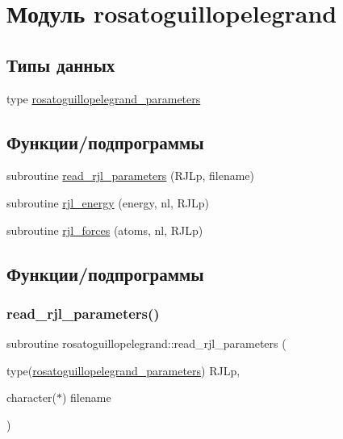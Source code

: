\hypertarget{namespacerosatoguillopelegrand}{}\section{Модуль rosatoguillopelegrand}
\label{namespacerosatoguillopelegrand}
\subsection*{Типы данных}
\begin{DoxyCompactItemize}
\item 
type \mbox{\hyperlink{structrosatoguillopelegrand_1_1rosatoguillopelegrand__parameters}{rosatoguillopelegrand\+\_\+parameters}}
\end{DoxyCompactItemize}
\subsection*{Функции/подпрограммы}
\begin{DoxyCompactItemize}
\item 
subroutine \mbox{\hyperlink{namespacerosatoguillopelegrand_ac5fa55316f7b8e860b3131c6f95c10ae}{read\+\_\+rjl\+\_\+parameters}} (R\+J\+Lp, filename)
\item 
subroutine \mbox{\hyperlink{namespacerosatoguillopelegrand_a06b6c23e50e301e053ed9ccb60e1ca34}{rjl\+\_\+energy}} (energy, nl, R\+J\+Lp)
\item 
subroutine \mbox{\hyperlink{namespacerosatoguillopelegrand_a3744fc3d1e6df3ca288ddc43df483ca0}{rjl\+\_\+forces}} (atoms, nl, R\+J\+Lp)
\end{DoxyCompactItemize}


\subsection{Функции/подпрограммы}
\mbox{\label{namespacerosatoguillopelegrand_ac5fa55316f7b8e860b3131c6f95c10ae}} 
\subsubsection{\texorpdfstring{read\+\_\+rjl\+\_\+parameters()}{read\_rjl\_parameters()}}
{\footnotesize\ttfamily subroutine rosatoguillopelegrand\+::read\+\_\+rjl\+\_\+parameters (\begin{DoxyParamCaption}\item[{type(\mbox{\hyperlink{structrosatoguillopelegrand_1_1rosatoguillopelegrand__parameters}{rosatoguillopelegrand\+\_\+parameters}})}]{R\+J\+Lp,  }\item[{character($\ast$)}]{filename }\end{DoxyParamCaption})}



